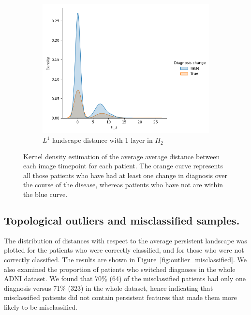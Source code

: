 \documentclass{article}
\begin{document}
\begin{figure}
\begin{subfigure}{0.32\textwidth}
    \includegraphics[width=\textwidth]{figures/temporal_evolution/landscape_H_2_dist_diag_change.png}
    \caption{$L^{1}$ landscape distance with 1 layer in $H_2$}
  \end{subfigure}
  \caption{Kernel density estimation of the average average distance between each image timepoint
    for each patient. The orange curve represents all those patients who have had at least one
    change in diagnosis over the course of the disease, whereas patients who have not are within the
    blue curve.}
  \label{fig:kde_intra_patient}
\end{figure}

\subsection{Topological outliers and misclassified samples.}

The distribution of distances with respect to the average persistent landscape was plotted for the
patients who were correctly classified, and for those who were not correctly classified. The results
are shown in Figure~\ref{fig:outlier_misclassified}. We also examined the proportion of patients who
switched diagnoses in the whole ADNI dataset. We found that 70\% (64) of the misclassified patients
had only one diagnosis versus 71\% (323) in the whole dataset, hence indicating that misclassified
patients did not contain persistent features that made them more likely to be misclassified.
\end{document}
